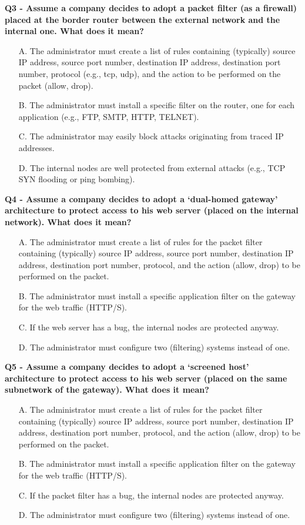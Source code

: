 \textbf{Q3 - Assume a company decides to adopt a packet filter (as a firewall) placed at the border router between the external network and the internal one. What does it mean?}
\begin{itemize}
    \item[A.] The administrator must create a list of rules containing (typically) source IP address, source port number, destination IP address, destination port number, protocol (e.g., tcp, udp), and the action to be performed on the packet (allow, drop).
    \item[B.] The administrator must install a specific filter on the router, one for each application (e.g., FTP, SMTP, HTTP, TELNET).
    \item[C.] The administrator may easily block attacks originating from traced IP addresses.
    \item[D.] The internal nodes are well protected from external attacks (e.g., TCP SYN flooding or ping bombing).
\end{itemize}

\textbf{Q4 - Assume a company decides to adopt a ‘dual-homed gateway’ architecture to protect access to his web server (placed on the internal network). What does it mean?}
\begin{itemize}
    \item[A.] The administrator must create a list of rules for the packet filter containing (typically) source IP address, source port number, destination IP address, destination port number, protocol, and the action (allow, drop) to be performed on the packet.
    \item[B.] The administrator must install a specific application filter on the gateway for the web traffic (HTTP/S).
    \item[C.] If the web server has a bug, the internal nodes are protected anyway.
    \item[D.] The administrator must configure two (filtering) systems instead of one.
\end{itemize}

\textbf{Q5 - Assume a company decides to adopt a ‘screened host’ architecture to protect access to his web server (placed on the same subnetwork of the gateway). What does it mean?}
\begin{itemize}
    \item[A.] The administrator must create a list of rules for the packet filter containing (typically) source IP address, source port number, destination IP address, destination port number, protocol, and the action (allow, drop) to be performed on the packet.
    \item[B.] The administrator must install a specific application filter on the gateway for the web traffic (HTTP/S).
    \item[C.] If the packet filter has a bug, the internal nodes are protected anyway.
    \item[D.] The administrator must configure two (filtering) systems instead of one.
\end{itemize}

